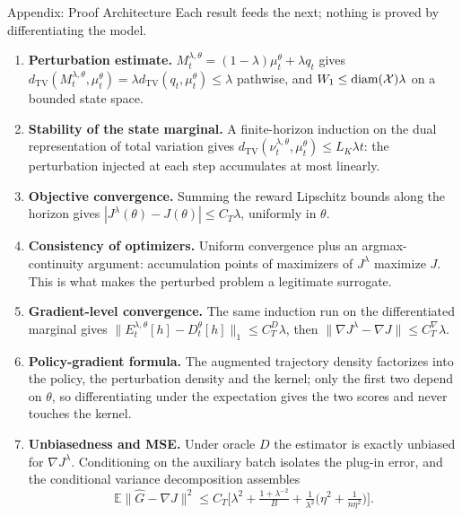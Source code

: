 \documentclass[9pt]{beamer}
\def\Xc{{\cal X}}
\def\E{{\mathbb E}}
\newcommand{\TV}{d_{\mathrm{TV}}}
\begin{document}
\begin{frame}{Appendix: Proof Architecture}
\footnotesize
Each result feeds the next; nothing is proved by differentiating the model.

\vspace{0.15cm}
\begin{enumerate}
  \item \textbf{Perturbation estimate.} $M_t^{\lambda,\theta}=(1-\lambda)\mu_t^\theta+\lambda q_t$ gives $\TV(M_t^{\lambda,\theta},\mu_t^\theta)=\lambda\TV(q_t,\mu_t^\theta)\leq\lambda$ pathwise, and $W_1\leq\operatorname{diam}(\Xc)\lambda$ on a bounded state space.
  \item \textbf{Stability of the state marginal.} A finite-horizon induction on the dual representation of total variation gives $\TV(\nu_t^{\lambda,\theta},\mu_t^\theta)\leq L_K\lambda t$: the perturbation injected at each step accumulates at most linearly.
  \item \textbf{Objective convergence.} Summing the reward Lipschitz bounds along the horizon gives $|J^\lambda(\theta)-J(\theta)|\leq C_T\lambda$, uniformly in $\theta$.
  \item \textbf{Consistency of optimizers.} Uniform convergence plus an argmax-continuity argument: accumulation points of maximizers of $J^\lambda$ maximize $J$. This is what makes the perturbed problem a legitimate surrogate.
  \item \textbf{Gradient-level convergence.} The same induction run on the differentiated marginal gives $\|E_t^{\lambda,\theta}[h]-D_t^\theta[h]\|_1\leq C_T^D\lambda$, then $\|\nabla J^\lambda-\nabla J\|\leq C_T^\nabla\lambda$.
  \item \textbf{Policy-gradient formula.} The augmented trajectory density factorizes into the policy, the perturbation density and the kernel; only the first two depend on $\theta$, so differentiating under the expectation gives the two scores and never touches the kernel.
  \item \textbf{Unbiasedness and MSE.} Under oracle $D$ the estimator is exactly unbiased for $\nabla J^\lambda$. Conditioning on the auxiliary batch isolates the plug-in error, and the conditional variance decomposition assembles
  \[
    \E\|\widehat G-\nabla J\|^2\leq C_T\Big[\lambda^2+\tfrac{1+\lambda^{-2}}{B}+\tfrac1{\lambda^2}\big(\eta^2+\tfrac1{n\eta^2}\big)\Big].
  \]
\end{enumerate}
\end{frame}
\end{document}
